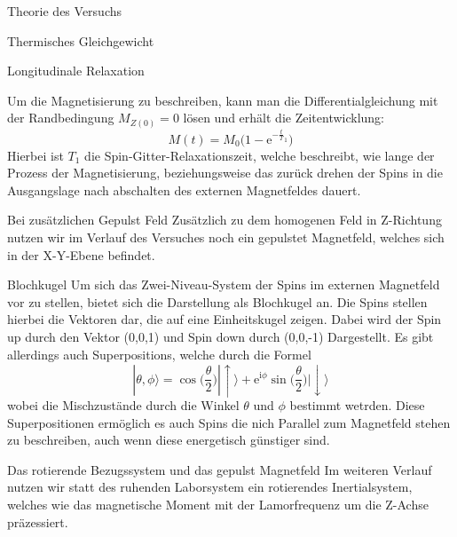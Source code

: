 \documentclass[pdftex, a4paper,11pt, twoside, ngerman]{report}
\begin{document}
\begin{chapter}{Theorie des Versuchs}
\begin{section}{Thermisches Gleichgewicht}
    \end{section}

    \begin{section}{Longitudinale Relaxation}

        Um die Magnetisierung zu beschreiben, kann man die Differentialgleichung \todo
        mit der Randbedingung $M_{Z(0)} =0$ lösen und erhält die Zeitentwicklung:
        \[
            M(t) = M_0\big (1-\mathrm e^{-\frac tT_1}\big)
        \]
        Hierbei ist $T_1$ die Spin-Gitter-Relaxationszeit, welche beschreibt, wie lange der Prozess der Magnetisierung, beziehungsweise das zurück drehen der Spins in die Ausgangslage nach abschalten des externen Magnetfeldes dauert.

    \end{section}

    \begin{section}{Bei zusätzlichen Gepulst Feld}
        Zusätzlich zu dem homogenen Feld in Z-Richtung nutzen wir im Verlauf des Versuches noch ein gepulstet Magnetfeld, welches sich in der X-Y-Ebene befindet.

        \begin{subsection}{Blochkugel}
            Um sich das Zwei-Niveau-System der Spins im externen Magnetfeld vor zu stellen, bietet sich die Darstellung als Blochkugel an.
            Die Spins stellen hierbei die Vektoren dar, die auf eine Einheitskugel zeigen.
            Dabei wird der Spin up durch den Vektor (0,0,1) und Spin down durch (0,0,-1) Dargestellt.
            Es gibt allerdings auch Superpositions, welche durch die Formel 
            \[
                |\theta,\phi\rangle = \cos\big (\frac \theta 2 \big ) |\uparrow\rangle + \mathrm e^{\mathrm i\phi}\sin\big (\frac \theta 2\big )|\downarrow\rangle
            \]
            wobei die Mischzustände durch die Winkel $\theta$ und $\phi$ bestimmt wetrden.
            Diese Superpositionen ermöglich es auch Spins die nich Parallel zum Magnetfeld stehen zu beschreiben, auch wenn diese energetisch günstiger sind.

        \end{subsection}

        \begin{subsection}{Das rotierende Bezugssystem und das gepulst Magnetfeld}
            Im weiteren Verlauf nutzen wir statt des ruhenden Laborsystem ein rotierendes Inertialsystem, welches wie das magnetische Moment mit der Lamorfrequenz um die Z-Achse präzessiert.

        \end{subsection}
    \end{section}


    
  \end{chapter}
  
\end{document}
